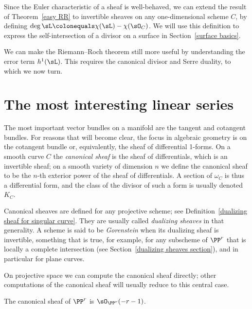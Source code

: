 Since the Euler characteristic of a sheaf is well-behaved, we can extend the result of Theorem~\ref{easy RR} 
to invertible sheaves on any one-dimensional scheme $C$, by defining
$\deg \sL \colonequals \chi(\sL) -\chi(\sO_C)$.
We will use this definition to express the self-intersection of a divisor on a surface in Section~\ref{surface basics}.

We can make the Riemann--Roch theorem still more useful by understanding the error term $h^1(\sL)$. This requires
the canonical divisor and Serre duality, to which
we now turn.


\section{The most interesting linear series}\label{most interesting}

The most important vector bundles on a manifold are the tangent and cotangent bundles. For reasons that
%
will become clear, the focus in algebraic geometry is on the cotangent
bundle or, equivalently, the sheaf of differential 1-forms. On a
smooth curve $C$ the \emph{canonical sheaf} is the sheaf of
differentials, which is an 
%
invertible sheaf; on a smooth
variety of dimension $n$ we define the canonical sheaf to be the 
$n$-th exterior power of the sheaf of differentials. A section of 
$\omega_C$ is thus a differential form, and the class of the divisor
of such a form is usually denoted 
$K_C$.
%

\begin{fact}
Canonical sheaves are defined for any projective scheme; see 
Definition~\ref{dualizing sheaf for singular curve}.
They are usually called 
%
{\it dualizing sheaves\/} 
in that generality. 
A scheme is said to be \emph{Gorenstein} when its dualizing sheaf 
is invertible,
%
something that is true, for example, for any subscheme of $\PP^r$
that is locally a complete intersection 
(see Section~\ref{dualizing sheaves section}),
and in particular for plane curves.
\end{fact}
 

On projective space we can compute the canonical sheaf directly; other computations of the canonical sheaf will usually reduce to this central case.

\begin{theorem}
 The 
canonical sheaf of $\PP^{r}$
%
is $\sO_{\PP^{r}}(-r-1)$. 
\vspace*{-\parskip}
\end{theorem}

